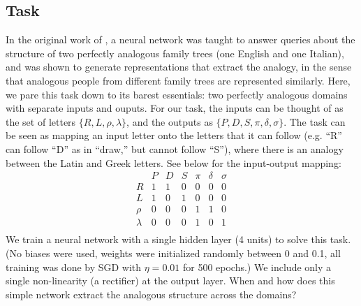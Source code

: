 \documentclass[10pt,letterpaper]{article}
\begin{document}
\subsection{Task}
In the original work of \citet{Hinton1986}, a neural network was taught to answer queries about the structure of two perfectly analogous family trees (one English and one Italian), and was shown to generate representations that extract the analogy, in the sense that analogous people from different family trees are represented similarly. Here, we pare this task down to its barest essentials: two perfectly analogous domains with separate inputs and ouputs. For our task, the inputs can be thought of as the set of letters \(\{R,L,\rho,\lambda\}\), and the outputs as \(\{P,D,S,\pi,\delta,\sigma\}\). The task can be seen as mapping an input letter onto the letters that it can follow (e.g. ``R'' can follow ``D'' as in ``draw,'' but cannot follow ``S''), where there is an analogy between the Latin and Greek letters. See below for the input-output mapping: 
\[
\begin{array}{c|cccccc} 
& P & D & S & \pi & \delta & \sigma \\
\hline
R & 1 & 1 & 0 & 0 & 0 & 0 \\
L & 1 & 0 & 1 & 0 & 0 & 0 \\
\rho & 0 & 0 & 0 & 1 & 1 & 0\\
\lambda & 0 & 0 & 0 & 1 & 0 & 1\\
\end{array} 
\]
We train a neural network with a single hidden layer (4 units) to solve this task. (No biases were used, weights were initialized randomly between 0 and 0.1, all training was done by SGD with \(\eta = 0.01\) for 500 epochs.) We include only a single non-linearity (a rectifier) at the output layer. When and how does this simple network extract the analogous structure across the domains? \par
\end{document}

